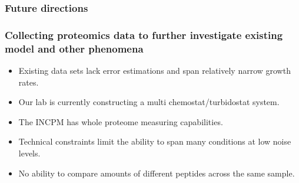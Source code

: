 \documentclass{beamer}
\begin{document}
\begin{frame}
\frametitle{Future directions}
\end{frame}

\begin{frame}
\frametitle{Collecting proteomics data to further investigate existing model and other phenomena}
\begin{itemize}
\item Existing data sets lack error estimations and span relatively narrow growth rates.
\item Our lab is currently constructing a multi chemostat/turbidostat system.
\item The INCPM has whole proteome measuring capabilities.
\item Technical constraints limit the ability to span many conditions at low noise levels.
\item No ability to compare amounts of different peptides across the same sample.
\end{itemize}
\end{frame}
\end{document}
